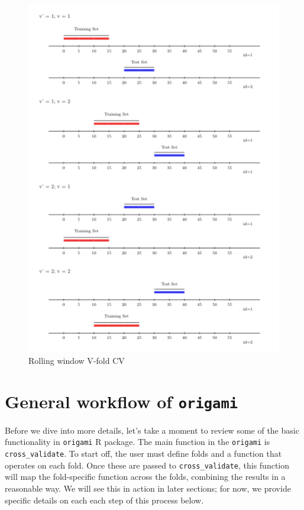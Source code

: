 \documentclass[12pt, krantz2,]{book}
\theoremstyle{definition}
\theoremstyle{definition}
\theoremstyle{definition}
\newcommand{\1}{\mathbbm{1}}
\begin{document}
\begin{figure}

{\centering \includegraphics[width=0.8\linewidth]{img/image/rolling_window_v_fold} 

}

\caption{Rolling window V-fold CV}\label{fig:unnamed-chunk-4}
\end{figure}

\hypertarget{general-workflow-of-origami}{%
\section{\texorpdfstring{General workflow of \texttt{origami}}{General workflow of origami}}\label{general-workflow-of-origami}}

Before we dive into more details, let's take a moment to review some of the
basic functionality in \texttt{origami} R package. The main function in the \texttt{origami}
is \texttt{cross\_validate}. To start off, the user must define folds and a function
that operates on each fold. Once these are passed to \texttt{cross\_validate}, this
function will map the fold-specific function across the folds, combining the
results in a reasonable way. We will see this in action in later sections; for
now, we provide specific details on each each step of this process below.
\end{document}
